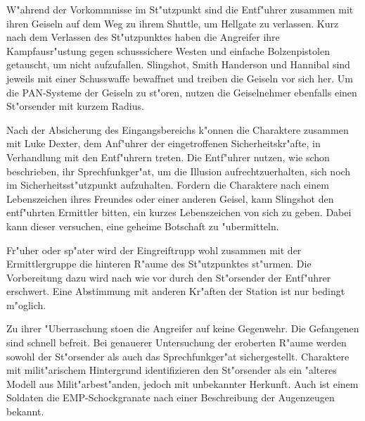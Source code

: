 
W"ahrend der Vorkommnisse im St"utzpunkt sind die Entf"uhrer zusammen mit ihren Geiseln auf dem Weg zu ihrem Shuttle, um Hellgate zu verlassen. Kurz nach dem Verlassen des St"utzpunktes haben die Angreifer ihre Kampfausr"ustung gegen schusssichere Westen und einfache Bolzenpistolen getauscht, um nicht aufzufallen. Slingshot, Smith Handerson und Hannibal sind jeweils mit einer Schusswaffe bewaffnet und treiben die Geiseln vor sich her. Um die PAN-Systeme der Geiseln zu st"oren, nutzen die Geiselnehmer ebenfalls einen St"orsender mit kurzem Radius.

Nach der Absicherung des Eingangsbereichs k"onnen die Charaktere zusammen mit Luke Dexter, dem Anf"uhrer der eingetroffenen Sicherheitskr"afte, in Verhandlung mit den Entf"uhrern treten. Die Entf"uhrer nutzen, wie schon beschrieben, ihr Sprechfunkger"at, um die Illusion aufrechtzuerhalten, sich noch im Sicherheitsst"utzpunkt aufzuhalten. Fordern die Charaktere nach einem Lebenszeichen ihres Freundes oder einer anderen Geisel, kann Slingshot den entf"uhrten Ermittler bitten, ein kurzes Lebenszeichen von sich zu geben. Dabei kann dieser versuchen, eine geheime Botschaft zu "ubermitteln.

Fr"uher oder sp"ater wird der Eingreiftrupp wohl zusammen mit der Ermittlergruppe die hinteren R"aume des St"utzpunktes st"urmen. Die Vorbereitung dazu wird nach wie vor durch den St"orsender der Entf"uhrer erschwert. Eine Abstimmung mit anderen Kr"aften der Station ist nur bedingt m"oglich.

Zu ihrer "Uberraschung sto\3en die Angreifer auf keine Gegenwehr. Die Gefangenen sind schnell befreit. Bei genauerer Untersuchung der eroberten R"aume werden sowohl der St"orsender als auch das Sprechfunkger"at sichergestellt. Charaktere mit milit"arischem Hintergrund identifizieren den St"orsender als ein "alteres Modell aus Milit"arbest"anden, jedoch mit unbekannter Herkunft. Auch ist einem Soldaten die EMP-Schockgranate nach einer Beschreibung der Augenzeugen bekannt.
\vfill

